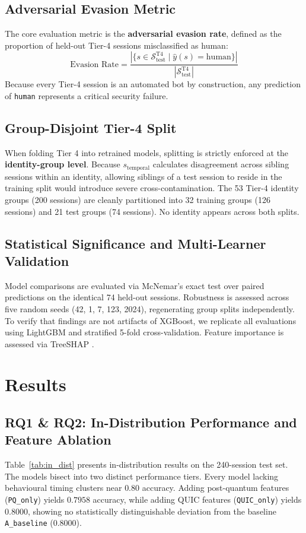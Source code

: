 \documentclass[conference]{IEEEtran}
\begin{document}
\subsection{Adversarial Evasion Metric}
The core evaluation metric is the \textbf{adversarial evasion rate}, defined as the proportion of held-out Tier-4 sessions misclassified as human:
\begin{equation}
\text{Evasion Rate} = \frac{|\{s \in \mathcal{S}_{\text{test}}^{\text{T4}} \mid \hat{y}(s) = \text{human}\}|}{|\mathcal{S}_{\text{test}}^{\text{T4}}|}
\label{eq:evasion}
\end{equation}
Because every Tier-4 session is an automated bot by construction, any prediction of \texttt{human} represents a critical security failure.

\subsection{Group-Disjoint Tier-4 Split}
When folding Tier 4 into retrained models, splitting is strictly enforced at the \textbf{identity-group level}. Because $s_{\text{temporal}}$ calculates disagreement across sibling sessions within an identity, allowing siblings of a test session to reside in the training split would introduce severe cross-contamination. The 53 Tier-4 identity groups (200 sessions) are cleanly partitioned into 32 training groups (126 sessions) and 21 test groups (74 sessions). No identity appears across both splits.

\subsection{Statistical Significance and Multi-Learner Validation}
Model comparisons are evaluated via McNemar's exact test \cite{mcnemar1947} over paired predictions on the identical 74 held-out sessions. Robustness is assessed across five random seeds (42, 1, 7, 123, 2024), regenerating group splits independently. To verify that findings are not artifacts of XGBoost, we replicate all evaluations using LightGBM \cite{ke2017lightgbm} and stratified 5-fold cross-validation. Feature importance is assessed via TreeSHAP \cite{lundberg2017shap}.

\section{Results}

\subsection{RQ1 \& RQ2: In-Distribution Performance and Feature Ablation}
Table~\ref{tab:in_dist} presents in-distribution results on the 240-session test set. The models bisect into two distinct performance tiers. Every model lacking behavioural timing clusters near $0.80$ accuracy. Adding post-quantum features (\texttt{PQ\_only}) yields $0.7958$ accuracy, while adding QUIC features (\texttt{QUIC\_only}) yields $0.8000$, showing no statistically distinguishable deviation from the baseline \texttt{A\_baseline} ($0.8000$).
\end{document}
